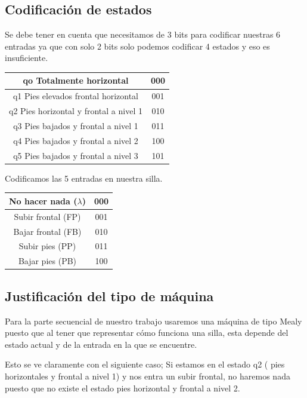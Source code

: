 \documentclass{article}
\begin{document}
\subsection{Codificación de estados}
\begin{multicols}{2}
\noindent Se debe tener en cuenta que necesitamos de 3 bits para codificar nuestras 6 entradas ya que con solo 2 bits solo podemos codificar 4 estados y eso es insuficiente.\vspace{5pt}
    \begin{tabular}{|c|c|}\hline
        qo Totalmente horizontal & 000\\\hline
        q1 Pies elevados frontal horizontal & 001 \\\hline
        q2 Pies horizontal y frontal a nivel 1 & 010 \\\hline
        q3 Pies bajados y frontal a nivel 1 & 011 \\\hline
        q4 Pies bajados y frontal a nivel 2 & 100 \\\hline
        q5 Pies bajados y frontal a nivel 3 & 101 \\\hline
    \end{tabular}

\columnbreak
\noindent Codificamos las 5 entradas en nuestra silla.\vspace{60pt}
\centering
    \begin{tabular}{|c|c|}\hline
        No hacer nada ($\lambda$) & 000\\\hline
        Subir frontal (FP) & 001 \\\hline
        Bajar frontal (FB) & 010 \\\hline
        Subir pies (PP) & 011 \\\hline
        Bajar pies (PB) & 100 \\\hline
    \end{tabular}
\end{multicols}
\subsection{Justificación del tipo de máquina}
Para la parte secuencial de nuestro trabajo usaremos una máquina de tipo Mealy puesto que al tener que representar cómo funciona una silla, esta depende del estado actual y de la entrada en la que se encuentre.

Esto se ve claramente con el siguiente caso; Si estamos en el estado q2 ( pies horizontales y frontal a nivel 1) y nos entra un subir frontal, no haremos nada puesto que no existe el estado pies horizontal y frontal a nivel 2.
\newpage
\end{document}
